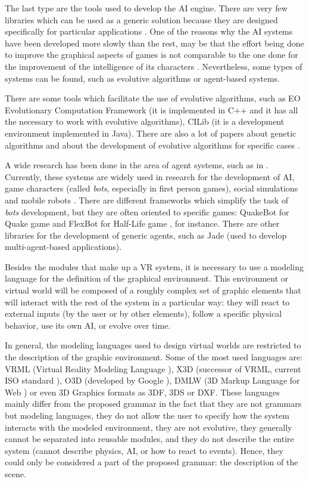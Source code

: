 \documentclass[12pt]{article}
\begin{document}
The last type are the tools used to develop the AI engine. There are very few libraries which can
be used as a generic solution because they are designed specifically for particular applications \cite{Sanchez2004}.
One of the reasons why the AI systems have been developed more slowly than the rest, may be that
the effort being done to improve the graphical aspects of games is not comparable to the one done
for the improvement of the intelligence of its characters \cite{Laird2001}. Nevertheless, some
types of systems can be found, such as evolutive algorithms or agent-based systems.

There are some tools which facilitate the use of evolutive algorithms, such as EO Evolutionary
Computation Framework \cite{EOECF} (it is implemented in C++ and it has all the necessary to work
with evolutive algorithms), CILib \cite{CILib} (it is a development environment implemented in
Java). There are also a lot of papers about genetic algorithms and about the development of
evolutive algorithms for specific cases \cite{Georgios2004,Chris2007,Robert2005}.

A wide research has been done in the area of agent systems, such as in
\cite{Wooldridge1997,Wood2000}. Currently, these systems are widely used in research for the
development of AI, game characters (called \textit{bots}, especially in first person games), social
simulations and mobile robots \cite{Novak2007,Sanchez2004,John2007,Kenyon2006}.
There are different frameworks which
simplify the task of \textit{bots} development, but they are often oriented to specific games:
QuakeBot for Quake game and FlexBot for Half-Life game \cite{Laird2001,Aaron2002}, for instance.
There are other libraries for the development of generic agents, such as Jade \cite{Jade} (used to
develop multi-agent-based applications).

Besides the modules that make up a VR system, it is necessary to use a modeling language for the
definition of the graphical environment. This environment or virtual world will be composed of a
roughly complex set of graphic elements that will interact with the rest of the system in a
particular way: they will react to external inputs (by the user or by other elements), follow a
specific physical behavior, use its own AI, or evolve over time.

In general, the modeling languages used to design virtual worlds \cite{Bartle2004} are restricted
to the description of the graphic environment. Some of the most used languages are: VRML (Virtual
Reality Modeling Language \cite{Web3D}), X3D (successor of VRML, current ISO standard
\cite{Web3D}), O3D (developed by Google \cite{O3D}), DMLW (3D Markup Language for Web \cite{DMLW})
or even 3D Graphics formats as 3DF, 3DS or DXF. These languages mainly differ from the proposed
grammar in the fact that they are not grammars but modeling languages, they do not allow the user
to specify how the system interacts with the modeled environment, they are not evolutive, they
generally cannot be separated into reusable modules, and they do not describe the entire system
(cannot describe physics, AI, or how to react to events). Hence, they could only be considered a
part of the proposed grammar: the description of the scene.
\end{document}
